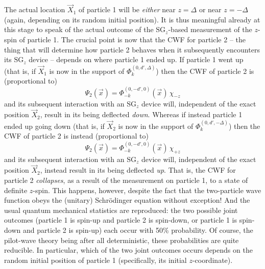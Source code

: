 \documentclass[aps,prc,onecolumn,letterpaper,floatfix,12pt]{revtex4}
\begin{document}
The actual location $\vec{X}_1$ of particle 1 will be \emph{either}
near $z=\Delta$ or near $z = -\Delta$ (again, depending on its random
initial position).  It is thus meaningful already at this stage to
speak of the actual outcome of the $\text{SG}_z$-based measurement of
the $z$-spin of particle 1.  The crucial point is now that the CWF for
particle 2 -- the thing that will determine how particle 2 behaves
when it subsequently encounters its $\text{SG}_z$ device -- depends on
where particle 1 ended up.  If particle 1 went up (that is,
if $\vec{X}_1$ is now in the support of $\Phi_k^{(0,d',\Delta)}$) then
the CWF of particle 2 is (proportional to)
\begin{equation}
\Psi_2(\vec{x}) = \Phi_{-k}^{(0,-d',0)}(\vec{x}) \, \chi_{-z}
\end{equation}
and its subsequent interaction with an $\text{SG}_z$ device will,
independent of the exact position $\vec{X}_2$, result in its being
deflected \emph{down}.  
Whereas if instead particle 1 ended up going down (that is, if $\vec{X}_2$
is now in the support of $\Phi_k^{(0,d',-\Delta)}$) then the CWF of
particle 2 is instead (proportional to)
\begin{equation}
\Psi_2(\vec{x}) = \Phi_{-k}^{(0,-d',0)} (\vec{x}) \, \chi_{+z}
\end{equation}
and its subsequent interaction with an $\text{SG}_z$ device will,
independent of the exact position $\vec{X}_2$, instead result in its
being deflected \emph{up}.  That is, the CWF for particle 2
\emph{collapses}, as a result of the measurement on particle 1,
to a state of definite $z$-spin.  This
happens, however, despite the fact that the two-particle wave function
obeys the (unitary) Schr\"odinger equation without exception!  And the
usual quantum mechanical statistics are reproduced:  the
two possible joint outcomes (particle 1 is spin-up and particle 2 is
spin-down, or particle 1 is spin-down and particle 2 is spin-up) each
occur with 50\% probability.   Of course, the pilot-wave theory being
after all deterministic, these probabilities are quite reducible.  In
particular, which of the two joint outcomes occurs depends on the
random initial position of particle 1 (specifically, its initial
$z$-coordinate).
\end{document}
